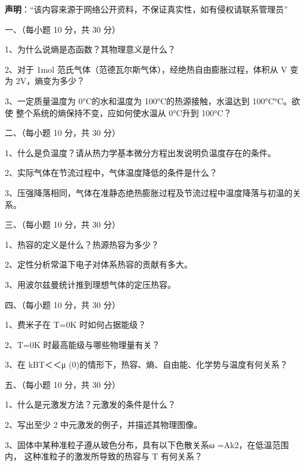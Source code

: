 

\textbf{声明}：“该内容来源于网络公开资料，不保证真实性，如有侵权请联系管理员”


一、（每小题 10 分，共 30 分）

1、为什么说熵是态函数？其物理意义是什么？

2、对于 1mol 范氏气体（范德瓦尔斯气体），经绝热自由膨胀过程，体积从 V 变为
2V，熵变为多少？

3、一定质量温度为 0°C的水和温度为 100°C的热源接触，水温达到 100°C°C。欲使
整个系统的熵保持不变，应如何使水温从 0°C升到 100°C？

二、（每小题 10 分，共 30 分）

1、什么是负温度？请从热力学基本微分方程出发说明负温度存在的条件。

2、实际气体在节流过程中，气体温度降低的条件是什么？

3、压强降落相同，气体在准静态绝热膨胀过程及节流过程中温度降落与初温的关系。

三、（每小题 10 分，共 30 分）

1、热容的定义是什么？热源热容为多少？

2、定性分析常温下电子对体系热容的贡献有多大。

3、用波尔兹曼统计推到理想气体的定压热容。

四、（每小题 10 分，共 30 分）

1、费米子在 T=0K 时如何占据能级？

2、T=0K 时最高能级与哪些物理量有关？

3、在 kBT＜＜μ (0)的情形下，热容、熵、自由能、化学势与温度有何关系？

五、（每小题 10 分，共 30 分）

1、什么是元激发方法？元激发的条件是什么？

2、写出至少 2 中元激发的例子，并描述其物理图像。

3、固体中某种准粒子遵从玻色分布，具有以下色散关系ω =Ak2，在低温范围内，
这种准粒子的激发所导致的热容与 T 有何关系？